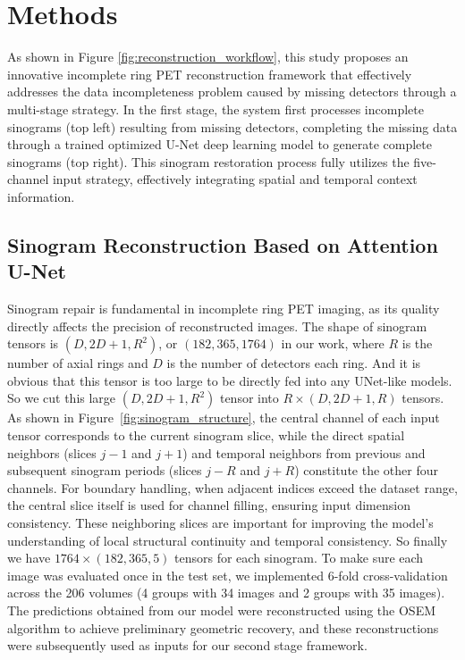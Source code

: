 \documentclass[aps,prb,preprint,groupedaddress,showkeys]{revtex4}
\begin{document}
\section{Methods}
\label{chap:methods}


As shown in Figure \ref{fig:reconstruction_workflow}, this study proposes an innovative incomplete ring PET reconstruction framework that effectively addresses the data incompleteness problem caused by missing detectors through a multi-stage strategy. In the first stage, the system first processes incomplete sinograms (top left) resulting from missing detectors, completing the missing data through a trained optimized U-Net deep learning model to generate complete sinograms (top right). This sinogram restoration process fully utilizes the five-channel input strategy, effectively integrating spatial and temporal context information.


\subsection{Sinogram Reconstruction Based on Attention U-Net}
\label{sec:unet_sinogram}

Sinogram repair is fundamental in incomplete ring PET imaging, as its quality directly affects the precision of reconstructed images. 
The shape of sinogram tensors is $(D, 2D+1, R^2)$, or $(182, 365, 1764)$ in our work, where $R$ is the number of axial rings and $D$ is the number of detectors each ring. And it is obvious that this tensor is too large to be directly fed into any UNet-like models. So we cut this large $(D, 2D+1, R^2)$ tensor into $R\times(D, 2D+1, R)$ tensors. 
As shown in Figure~\ref{fig:sinogram_structure}, the central channel of each input tensor corresponds to the current sinogram slice, while the direct spatial neighbors (slices $j-1$ and $j+1$) and temporal neighbors from previous and subsequent sinogram periods (slices $j-R$ and $j+R$) constitute the other four channels. For boundary handling, when adjacent indices exceed the dataset range, the central slice itself is used for channel filling, ensuring input dimension consistency. These neighboring slices are important for improving the model's understanding of local structural continuity and temporal consistency. So finally we have $1764\times(182, 365, 5)$ tensors for each sinogram. 
To make sure each image was evaluated once in the test set, we implemented 6-fold cross-validation across the 206 volumes (4 groups with 34 images and 2 groups with 35 images). The predictions obtained from our model were reconstructed using the OSEM algorithm to achieve preliminary geometric recovery, and these reconstructions were subsequently used as inputs for our second stage framework.
\end{document}
